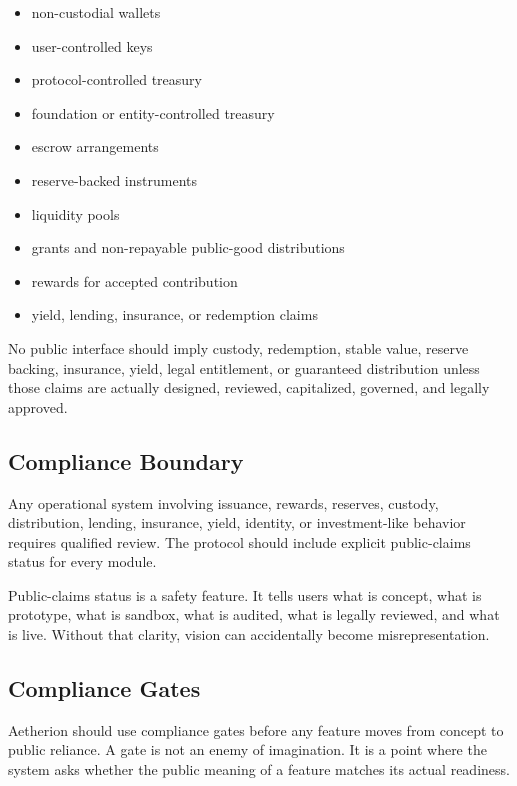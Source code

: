 \documentclass[12pt]{article}
\begin{document}
\begin{itemize}
  \item non-custodial wallets
  \item user-controlled keys
  \item protocol-controlled treasury
  \item foundation or entity-controlled treasury
  \item escrow arrangements
  \item reserve-backed instruments
  \item liquidity pools
  \item grants and non-repayable public-good distributions
  \item rewards for accepted contribution
  \item yield, lending, insurance, or redemption claims
\end{itemize}

No public interface should imply custody, redemption, stable value, reserve backing, insurance, yield, legal entitlement, or guaranteed distribution unless those claims are actually designed, reviewed, capitalized, governed, and legally approved.

\subsection{Compliance Boundary}

Any operational system involving issuance, rewards, reserves, custody, distribution, lending, insurance, yield, identity, or investment-like behavior requires qualified review. The protocol should include explicit public-claims status for every module.

Public-claims status is a safety feature. It tells users what is concept, what is prototype, what is sandbox, what is audited, what is legally reviewed, and what is live. Without that clarity, vision can accidentally become misrepresentation.

\subsection{Compliance Gates}

Aetherion should use compliance gates before any feature moves from concept to public reliance. A gate is not an enemy of imagination. It is a point where the system asks whether the public meaning of a feature matches its actual readiness.
\end{document}
